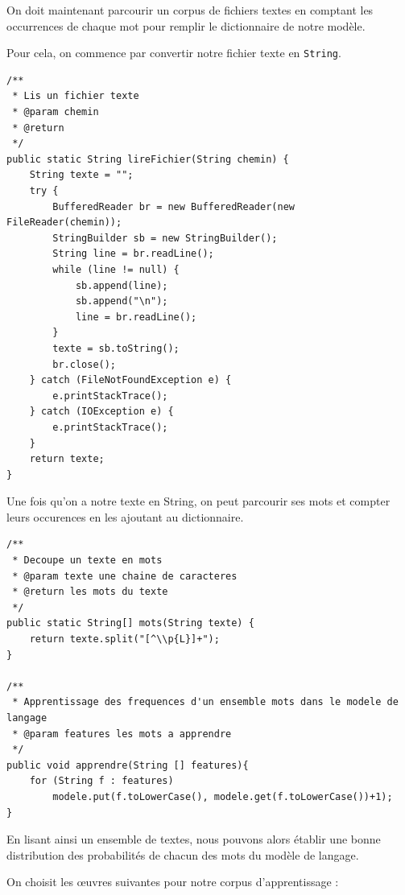 \documentclass[10pt,a4paper]{article}
\begin{document}
On doit maintenant parcourir un corpus de fichiers textes en comptant les occurrences de chaque mot pour remplir le dictionnaire de notre modèle.

Pour cela, on commence par convertir notre fichier texte en \verb!String!.

\begin{lstlisting}
/**
 * Lis un fichier texte
 * @param chemin
 * @return
 */
public static String lireFichier(String chemin) {
    String texte = "";
    try {
        BufferedReader br = new BufferedReader(new FileReader(chemin));
        StringBuilder sb = new StringBuilder();
        String line = br.readLine();
        while (line != null) {
            sb.append(line);
            sb.append("\n");
            line = br.readLine();
        }
        texte = sb.toString();
        br.close();
    } catch (FileNotFoundException e) { 
        e.printStackTrace();
    } catch (IOException e) { 
        e.printStackTrace();
    }
    return texte;	    		
}
\end{lstlisting}

Une fois qu'on a notre texte en String, on peut parcourir ses mots et compter leurs occurences en les ajoutant au dictionnaire.

\begin{lstlisting}
/**
 * Decoupe un texte en mots
 * @param texte une chaine de caracteres
 * @return les mots du texte
 */
public static String[] mots(String texte) {
    return texte.split("[^\\p{L}]+");
}

/**
 * Apprentissage des frequences d'un ensemble mots dans le modele de langage
 * @param features les mots a apprendre
 */
public void apprendre(String [] features){
    for (String f : features)
        modele.put(f.toLowerCase(), modele.get(f.toLowerCase())+1);
}
\end{lstlisting}

En lisant ainsi un ensemble de textes, nous pouvons alors établir une bonne distribution des probabilités de chacun des mots du modèle de langage.

On choisit les œuvres suivantes pour notre corpus d'apprentissage : 
\end{document}

